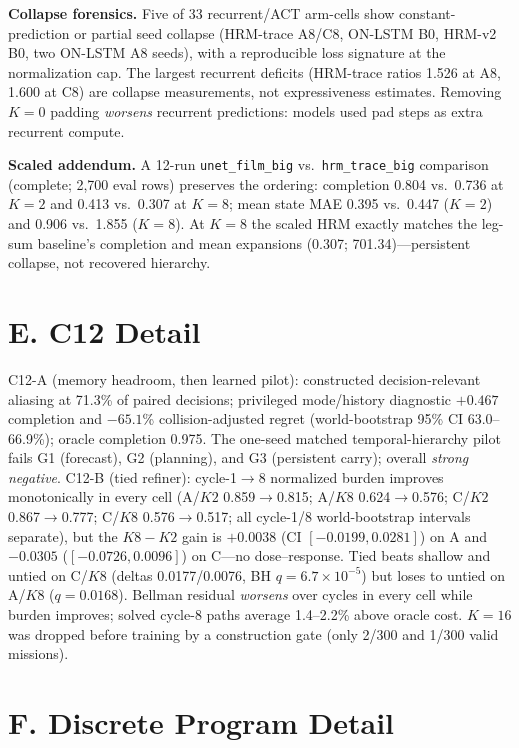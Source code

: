 \documentclass[letterpaper]{article} %
\newcommand{\stage}[1]{\textsc{#1}}
\begin{document}
\textbf{Collapse forensics.} Five of 33 recurrent/ACT arm-cells show constant-prediction or partial seed collapse (HRM-trace A8/C8, ON-LSTM B0, HRM-v2 B0, two ON-LSTM A8 seeds), with a reproducible loss signature at the normalization cap. The largest recurrent deficits (HRM-trace ratios 1.526 at A8, 1.600 at C8) are collapse measurements, not expressiveness estimates. Removing $K{=}0$ padding \emph{worsens} recurrent predictions: models used pad steps as extra recurrent compute.

\textbf{Scaled addendum.} A 12-run \texttt{unet\_film\_big} vs.\ \texttt{hrm\_trace\_big} comparison (complete; 2{,}700 eval rows) preserves the ordering: completion 0.804 vs.\ 0.736 at $K{=}2$ and 0.413 vs.\ 0.307 at $K{=}8$; mean state MAE 0.395 vs.\ 0.447 ($K{=}2$) and 0.906 vs.\ 1.855 ($K{=}8$). At $K{=}8$ the scaled HRM exactly matches the leg-sum baseline's completion and mean expansions (0.307; 701.34)---persistent collapse, not recovered hierarchy.

\section{E. \stage{C12} Detail}

\stage{C12-A} (memory headroom, then learned pilot): constructed decision-relevant aliasing at 71.3\% of paired decisions; privileged mode/history diagnostic $+0.467$ completion and $-65.1$\% collision-adjusted regret (world-bootstrap 95\% CI 63.0--66.9\%); oracle completion 0.975. The one-seed matched temporal-hierarchy pilot fails G1 (forecast), G2 (planning), and G3 (persistent carry); overall \emph{strong negative}. \stage{C12-B} (tied refiner): cycle-1$\to$8 normalized burden improves monotonically in every cell (A/$K2$ 0.859$\to$0.815; A/$K8$ 0.624$\to$0.576; C/$K2$ 0.867$\to$0.777; C/$K8$ 0.576$\to$0.517; all cycle-1/8 world-bootstrap intervals separate), but the $K8{-}K2$ gain is $+0.0038$ (CI $[-0.0199, 0.0281]$) on A and $-0.0305$ ($[-0.0726, 0.0096]$) on C---no dose--response. Tied beats shallow and untied on C/$K8$ (deltas 0.0177/0.0076, BH $q{=}6.7{\times}10^{-5}$) but loses to untied on A/$K8$ ($q{=}0.0168$). Bellman residual \emph{worsens} over cycles in every cell while burden improves; solved cycle-8 paths average 1.4--2.2\% above oracle cost. $K{=}16$ was dropped before training by a construction gate (only 2/300 and 1/300 valid missions).

\section{F. Discrete Program Detail}
\end{document}
